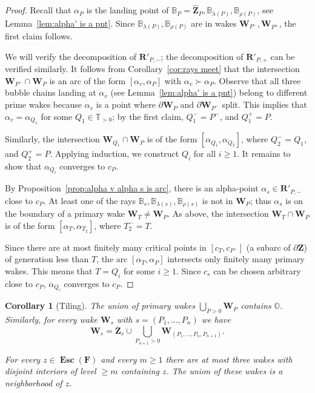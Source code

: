 \documentclass{amsart}
\newcommand{\1}{{\mathbb 1 }}
\newcommand\PT{\mathbb{ T}}
\newcommand{\bB}{{\mathbb{B}}}
\newcommand{\bO}{{\mathbb{O}}}
\newcommand{\bF}{{\mathbf F}}
\newcommand{\bZ}{{\mathbf Z}}
\newcommand{\bW}{{\mathbf W}}
\newcommand{\bR}{{\mathbf R}}
\newtheorem{cor}[thm]{Corollary}
\theoremstyle{remark}
\numberwithin{equation}{section}
\theoremstyle{definition}
\newcommand{\Esc}{{\boldsymbol{\operatorname{Esc}}}}
\theoremstyle{nonumberbreak}
\begin{document}
\begin{proof}
Recall that $\alpha_P$ is the landing point of $\bB_P=\widehat \bZ_P,\bB_{\lambda(P)}, \bB_{\rho(P)}$, see Lemma~\ref{lem:alpha' is a pnt}. Since $\bB_{\lambda(P)}, \bB_{\rho(P)}$ are in wakes $\bW_{P^-},\bW_{P^+}$, the first claim follows.

We will verify the decomposition of $\bR'_{P,-}$; the decomposition of $\bR'_{P,+}$ can be verified similarly.  It follows from Corollary~\ref{cor:rays meet} that the intersection $ \bW_{P^-}\cap \bW_{P}$ is an arc of the form $[\alpha_v,\alpha_P]$ with $\alpha_v\succ \alpha_P$. Observe that all three bubble chains landing at $\alpha_v$ (see Lemma~\ref{lem:alpha' is a pnt}) belong to different prime wakes because $\alpha_v$ is a point where $\partial \bW_P$ and  $\partial \bW_{P^-}$ split. This implies that $\alpha_v=\alpha_{Q_1}$ for some $Q_1\in \PT_{>0}$; by the first claim, $Q_1^-=P^-$, and $Q_1^+=P$.
 
Similarly, the intersection $ \bW_{Q_1}\cap \bW_{P}$ is of the form $[\alpha_{Q_1},\alpha_{Q_2}]$, where $Q_2^-=Q_1$, and $Q_2^+=P$. Applying induction, we construct $Q_i$ for all $i\ge 1$. It remains to show that $\alpha_{Q_i}$ converges to $c_P$.


 
By Proposition~\ref{prop:alpha v alpha s is arc}, there is an alpha-point $\alpha_s\in \bR'_{P,-}$ close to $c_P$. At least one of the rays $\bB_s, \bB_{\lambda(s)},\bB_{\rho(s)}$ is not in $\bW_P$; thus $\alpha_s$ is on the boundary of a primary wake $\bW_T\not=\bW_P$. As above, the intersection $\bW_T\cap \bW_P$ is of the form $[\alpha_T,\alpha_{T_2}]$, where $T_2^-=T$.

Since there are at most finitely many critical points in $[c_T,c_{P^-}]$ (a subarc of $\partial \bZ$) of generation less than $T$, the arc $[\alpha_{T}, \alpha_{P}]$ intersects only finitely many primary wakes. This means that $T=Q_i$ for some $i\ge 1$. Since $c_s$ can be chosen arbitrary close to $c_P$, $\alpha_{Q_i}$ converges to $c_P$.
 \end{proof}


\begin{cor}[Tiling]
\label{cor:no ghost limb}
The union of primary wakes $\displaystyle\bigcup_{P>0} \bW_P$ contains $\bO$. Similarly, for every wake $\bW_s$
 with $s=(P_1,\dots, P_n)$ we have
\begin{equation}
\label{eq:cor:no ghost limb}
\bW_s=\overline \bZ_s\cup \bigcup_{P_{n+1}>0}\bW_{(P_1,\dots, P_n,P_{n+1})}. 
\end{equation} 

For every $z\in \Esc(\bF)$ and every $m\ge 1$ there are at most three wakes with disjoint interiors of level $\ge m$ containing $z$. The union of these wakes is a neighborhood of $z$.
\end{cor} 
\end{document}
